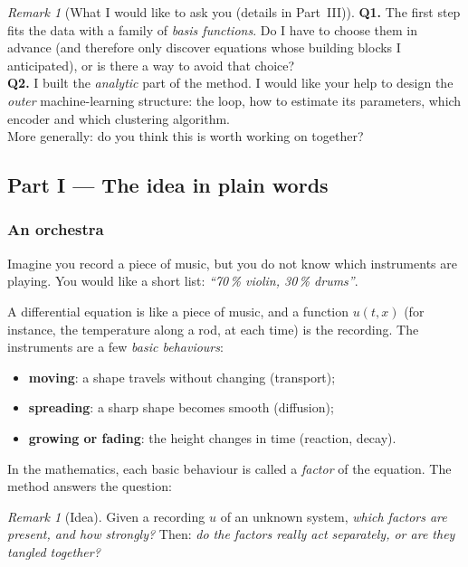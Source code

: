 \documentclass[11pt]{article}
\theoremstyle{plain}
\theoremstyle{definition}
\theoremstyle{remark}
\newtheorem{remark}[theorem]{Remark}
\newenvironment{ideabox}[1][]{\begin{remark}[Idea]}{\end{remark}}
\newenvironment{askbox}[1]{\begin{remark}[#1]}{\end{remark}}
\begin{document}
\begin{askbox}{What I would like to ask you (details in Part~III)}
\textbf{Q1.} The first step fits the data with a family of \emph{basis functions}. Do I have to choose them in advance (and therefore only discover equations whose building blocks I anticipated), or is there a way to avoid that choice?\\[2pt]
\textbf{Q2.} I built the \emph{analytic} part of the method. I would like your help to design the \emph{outer} machine-learning structure: the loop, how to estimate its parameters, which encoder and which clustering algorithm.\\[2pt]
More generally: do you think this is worth working on together?
\end{askbox}

\tableofcontents

\subsection*{Part I --- The idea in plain words}

\subsubsection*{An orchestra}
Imagine you record a piece of music, but you do not know which instruments are playing. You would like a short list: \emph{``70\,\% violin, 30\,\% drums''}.

A differential equation is like a piece of music, and a function $u(t,x)$ (for instance, the temperature along a rod, at each time) is the recording. The instruments are a few \emph{basic behaviours}:
\begin{itemize}[nosep]
\item \textbf{moving}: a shape travels without changing (transport);
\item \textbf{spreading}: a sharp shape becomes smooth (diffusion);
\item \textbf{growing or fading}: the height changes in time (reaction, decay).
\end{itemize}
In the mathematics, each basic behaviour is called a \emph{factor} of the equation. The method answers the question:

\begin{ideabox}
Given a recording $u$ of an unknown system, \emph{which factors are present, and how strongly?} Then: \emph{do the factors really act separately, or are they tangled together?}
\end{ideabox}
\end{document}
